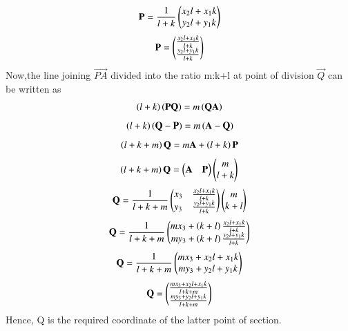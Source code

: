 \documentclass[journal,12pt,twocolumn]{IEEEtran}
\begin{document}
\begin{align}
     \mathbf{P}=\frac{1}{l+k}\begin{pmatrix}x_2l+x_1k\\y_2l+y_1k\end{pmatrix}
\end{align}
\begin{align}
     \mathbf{P}=\begin{pmatrix}\frac{x_2l+x_1k}{l+k}\\\frac{y_2l+y_1k}{l+k}\end{pmatrix}
\end{align}
Now,the line joining $\vec{PA}$ divided into the ratio m:k+l at point of division $\vec{Q}$ can be written as
\begin{align}
    \left(l+k\right)\left(\mathbf{PQ}\right)=m\left(\mathbf{QA}\right)
\end{align}
\begin{align}
    \left(l+k\right)\left(\mathbf{Q-P}\right)=m\left(\mathbf{A-Q}\right)
\end{align}
\begin{align}
    \left(l+k+m\right)\mathbf{Q}=m\mathbf{A}+\left(l+k\right)\mathbf{P}
\end{align}
\begin{align}
    \left(l+k+m\right)\mathbf{Q}=\begin{pmatrix}\mathbf{A} & \mathbf{P}\end{pmatrix}\begin{pmatrix}m\\l+k\end{pmatrix}
\end{align}
\begin{align}
    \mathbf{Q}=\frac{1}{l+k+m}\begin{pmatrix}x_3&\frac{x_2l+x_1k}{l+k}\\y_3&\frac{y_2l+y_1k}{l+k}\end{pmatrix}\begin{pmatrix}m\\k+l\end{pmatrix}
\end{align}
\begin{align}
    \mathbf{Q}=\frac{1}{l+k+m}\begin{pmatrix}mx_3+\left(k+l\right)\frac{x_2l+x_1k}{l+k}\\my_3+\left(k+l\right)\frac{y_2l+y_1k}{l+k}\end{pmatrix}
\end{align}
\begin{align}
    \mathbf{Q}=\frac{1}{l+k+m}\begin{pmatrix}mx_3+x_2l+x_1k\\my_3+y_2l+y_1k\end{pmatrix}
\end{align}
\begin{align}
    \mathbf{Q}=\begin{pmatrix}\frac{mx_3+x_2l+x_1k}{l+k+m}\\\frac{my_3+y_2l+y_1k}{l+k+m}\end{pmatrix}
\end{align}
Hence, Q is the required coordinate of the latter point of section.
\end{document}
